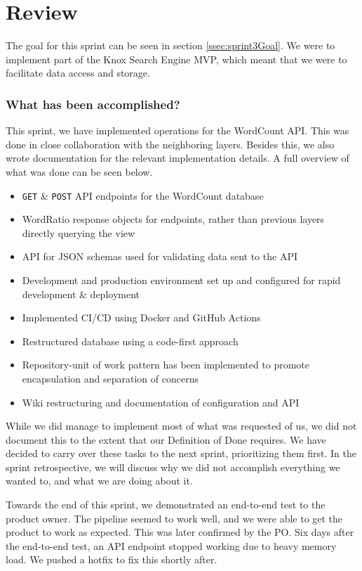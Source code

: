 \section{Review}
The goal for this sprint can be seen in section \ref{ssec:sprint3Goal}. We were to implement part of the Knox Search Engine MVP, which meant that we were to facilitate data access and storage.

\subsubsection{What has been accomplished?}
This sprint, we have implemented operations for the WordCount API. This was done in close collaboration with the neighboring layers. 
Besides this, we also wrote documentation for the relevant implementation details. A full overview of what was done can be seen below.

\begin{itemize}
    \item \texttt{GET} \& \texttt{POST} API endpoints for the WordCount database
    \item WordRatio response objects for endpoints, rather than previous layers directly querying the view
    \item API for JSON schemas used for validating data sent to the API
    \item Development and production environment set up and configured for rapid development \& deployment
    \item Implemented CI/CD using Docker and GitHub Actions
    \item Restructured database using a code-first approach
    \item Repository-unit of work pattern has been implemented to promote encapsulation and separation of concerns
    \item Wiki restructuring and documentation of configuration and API
\end{itemize}

While we did manage to implement most of what was requested of us, we did not document this to the extent that our Definition of Done requires. 
We have decided to carry over these tasks to the next sprint, prioritizing them first. In the sprint retrospective, we will discuss why we did not accomplish everything we wanted to, and what we are doing about it.

Towards the end of this sprint, we demonstrated an end-to-end test to the \knox{} product owner. The pipeline seemed to work well, and we were able to get the product to work as expected. This was later confirmed by the PO. 
Six days after the end-to-end test, an API endpoint stopped working due to heavy memory load. We pushed a hotfix to fix this shortly after.

